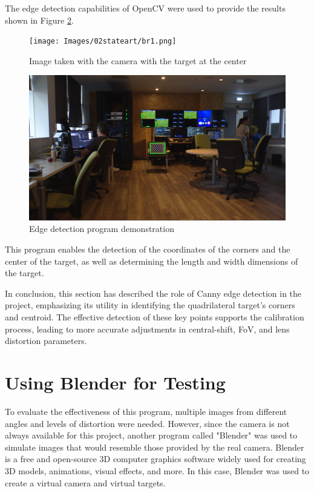\noindent The edge detection capabilities of OpenCV were used to 
provide the results shown in Figure \ref{fig:corners}.

\begin{figure}[h]
    \centering
    \texttt{[image: Images/02stateart/br1.png]}
    \caption{Image taken with the camera with the target at the center}
    \label{fig:target}
\end{figure}

\begin{figure}[h]
    \centering
    \includegraphics[width=\textwidth]{Images/02stateart/edge_detection.png}
    \caption{Edge detection program demonstration}
    \label{fig:corners}
\end{figure}

\noindent This program enables the detection of the coordinates of the corners and the center of the target, as well as determining the length and width dimensions of the target.

\noindent In conclusion, this section has described the role of Canny edge 
detection in the project, 
emphasizing its utility in identifying the quadrilateral target's corners and centroid. 
The effective detection of these key points supports the calibration process, leading to 
more accurate adjustments in central-shift, FoV, and lens distortion parameters.

\section{Using Blender for Testing}
\label{sec:blender_workflow}
\noindent To evaluate the effectiveness of this program, multiple images from different angles and levels of distortion were needed. However, since the camera is not always available for this project, another program called "Blender" was used to simulate images that would resemble those provided by the real camera. Blender is a free and open-source 3D computer graphics software widely used for creating 3D models, animations, visual effects, and more. In this case, Blender was used to create a virtual camera and virtual targets.

